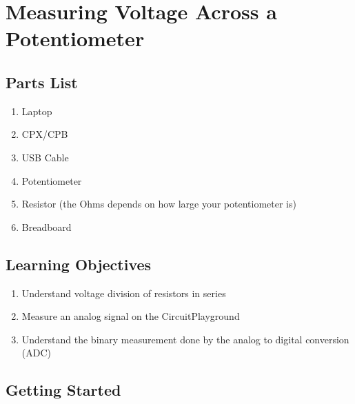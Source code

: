 \newpage

\section{Measuring Voltage Across a Potentiometer}
\label{s:voltage}

\subsection{Parts List}

\begin{enumerate}[itemsep=-5pt]
\item Laptop
\item CPX/CPB
\item USB Cable
\item Potentiometer
\item Resistor (the Ohms depends on how large your potentiometer is)
\item Breadboard
\end{enumerate}

\subsection{Learning Objectives}
\begin{enumerate}[itemsep=-5pt]
\item Understand voltage division of resistors in series
\item Measure an analog signal on the CircuitPlayground
\item Understand the binary measurement done by the analog to digital conversion (ADC)
\end{enumerate}

\subsection{Getting Started}

